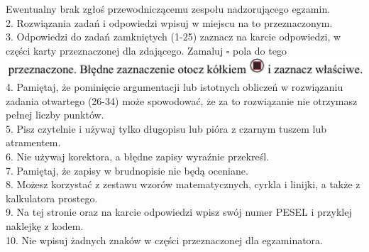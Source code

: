 \documentclass[10pt]{article}
\begin{document}
Ewentualny brak zgłoś przewodniczącemu zespołu nadzorującego egzamin.\\
2. Rozwiązania zadań i odpowiedzi wpisuj w miejscu na to przeznaczonym.\\
3. Odpowiedzi do zadań zamkniętych (1-25) zaznacz na karcie odpowiedzi, w części karty przeznaczonej dla zdającego. Zamaluj \(\square\) pola do tego\\
\includegraphics[max width=\textwidth, center]{2024_11_21_7b5527312ea89ae66fd0g-01(2)}\\
4. Pamiętaj, że pominięcie argumentacji lub istotnych obliczeń w rozwiązaniu zadania otwartego (26-34) może spowodować, że za to rozwiązanie nie otrzymasz pełnej liczby punktów.\\
5. Pisz czytelnie i używaj tylko długopisu lub pióra z czarnym tuszem lub atramentem.\\
6. Nie używaj korektora, a błędne zapisy wyraźnie przekreśl.\\
7. Pamiętaj, że zapisy w brudnopisie nie będą oceniane.\\
8. Możesz korzystać z zestawu wzorów matematycznych, cyrkla i linijki, a także z kalkulatora prostego.\\
9. Na tej stronie oraz na karcie odpowiedzi wpisz swój numer PESEL i przyklej naklejkę z kodem.\\
10. Nie wpisuj żadnych znaków w części przeznaczonej dla egzaminatora.\\
\end{document}
